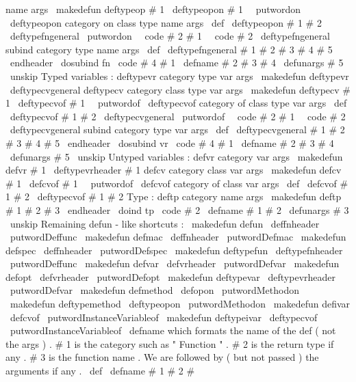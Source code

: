 {{name
args
\
makedefun
{
deftypeop
}
#
1
{
\
deftypeopon
{
#
1
\
\
putwordon
}
}
%
\
deftypeopon
{
category
on
}
class
type
name
args
\
def
\
deftypeopon
#
1
#
2
{
\
deftypefngeneral
{
\
putwordon
\
\
code
{
#
2
}
}
{
#
1
\
\
code
{
#
2
}
}
}
%
\
deftypefngeneral
{
subind
}
category
type
name
args
%
\
def
\
deftypefngeneral
#
1
#
2
#
3
#
4
#
5
\
endheader
{
%
\
dosubind
{
fn
}
{
\
code
{
#
4
}
}
{
#
1
}
%
\
defname
{
#
2
}
{
#
3
}
{
#
4
}
\
defunargs
{
#
5
\
unskip
}
%
}
%
%
%
Typed
variables
:
%
deftypevr
category
type
var
args
\
makedefun
{
deftypevr
}
{
\
deftypecvgeneral
{
}
}
%
deftypecv
category
class
type
var
args
\
makedefun
{
deftypecv
}
#
1
{
\
deftypecvof
{
#
1
\
\
putwordof
}
}
%
\
deftypecvof
{
category
of
}
class
type
var
args
\
def
\
deftypecvof
#
1
#
2
{
\
deftypecvgeneral
{
\
putwordof
\
\
code
{
#
2
}
}
{
#
1
\
\
code
{
#
2
}
}
}
%
\
deftypecvgeneral
{
subind
}
category
type
var
args
%
\
def
\
deftypecvgeneral
#
1
#
2
#
3
#
4
#
5
\
endheader
{
%
\
dosubind
{
vr
}
{
\
code
{
#
4
}
}
{
#
1
}
%
\
defname
{
#
2
}
{
#
3
}
{
#
4
}
\
defunargs
{
#
5
\
unskip
}
%
}
%
%
%
Untyped
variables
:
%
defvr
category
var
args
\
makedefun
{
defvr
}
#
1
{
\
deftypevrheader
{
#
1
}
{
}
}
%
defcv
category
class
var
args
\
makedefun
{
defcv
}
#
1
{
\
defcvof
{
#
1
\
\
putwordof
}
}
%
\
defcvof
{
category
of
}
class
var
args
\
def
\
defcvof
#
1
#
2
{
\
deftypecvof
{
#
1
}
#
2
{
}
}
%
%
%
Type
:
%
deftp
category
name
args
\
makedefun
{
deftp
}
#
1
#
2
#
3
\
endheader
{
%
\
doind
{
tp
}
{
\
code
{
#
2
}
}
%
\
defname
{
#
1
}
{
}
{
#
2
}
\
defunargs
{
#
3
\
unskip
}
%
}
%
Remaining
defun
-
like
shortcuts
:
\
makedefun
{
defun
}
{
\
deffnheader
{
\
putwordDeffunc
}
}
\
makedefun
{
defmac
}
{
\
deffnheader
{
\
putwordDefmac
}
}
\
makedefun
{
defspec
}
{
\
deffnheader
{
\
putwordDefspec
}
}
\
makedefun
{
deftypefun
}
{
\
deftypefnheader
{
\
putwordDeffunc
}
}
\
makedefun
{
defvar
}
{
\
defvrheader
{
\
putwordDefvar
}
}
\
makedefun
{
defopt
}
{
\
defvrheader
{
\
putwordDefopt
}
}
\
makedefun
{
deftypevar
}
{
\
deftypevrheader
{
\
putwordDefvar
}
}
\
makedefun
{
defmethod
}
{
\
defopon
\
putwordMethodon
}
\
makedefun
{
deftypemethod
}
{
\
deftypeopon
\
putwordMethodon
}
\
makedefun
{
defivar
}
{
\
defcvof
\
putwordInstanceVariableof
}
\
makedefun
{
deftypeivar
}
{
\
deftypecvof
\
putwordInstanceVariableof
}
%
\
defname
which
formats
the
name
of
the
def
(
not
the
args
)
.
%
#
1
is
the
category
such
as
"
Function
"
.
%
#
2
is
the
return
type
if
any
.
%
#
3
is
the
function
name
.
%
%
We
are
followed
by
(
but
not
passed
)
the
arguments
if
any
.
%
\
def
\
defname
#
1
#
2
#
}}
